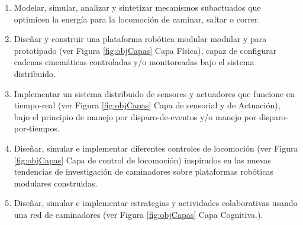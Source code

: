 \begin{enumerate}[\textbf{OE:} 1.]
\item Modelar, simular, analizar y sintetizar mecanismos subactuados que optimicen la energ\'ia para la locomoci\'on de caminar, saltar o correr.\par 
\item Dise\~nar y construir una plataforma rob\'otica modular modular y para prototipado (ver Figura \ref{fig:objCapas} Capa Física), capaz de configurar cadenas cinem\'aticas  controladas y/o monitoreadas bajo el sistema distribuido.\par
\item Implementar un sistema distribuido de sensores y actuadores que funcione en tiempo-real  (ver Figura \ref{fig:objCapas} Capa de sensorial y de Actuaci\'on), bajo el principio de manejo por disparo-de-eventos y/o manejo por disparo-por-tiempos\cite{Kimm2012}.\par
\item Dise\~nar, simular e implementar diferentes controles de locomoci\'on (ver Figura \ref{fig:objCapas} Capa de control de locomoci\'on) inspirados en las nuevas tendencias de investigaci\'on de caminadores sobre plataformas rob\'oticas modulares construidas.\par
\item Dise\~nar, simular e implementar estrategias y actividades colaborativas usando una red de caminadores  (ver Figura \ref{fig:objCapas} Capa Cognitiva.).\par
\end{enumerate}

